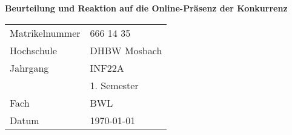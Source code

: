 \begin{titlepage}
\begin{center}
\vspace*{1cm}

\huge
\textbf{Beurteilung und Reaktion auf die Online-Präsenz der Konkurrenz}

\vspace{1.5cm}




\vfill

\normalsize
\begin{tabular}{ ll }
Matrikelnummer & 666 14 35\\
Hochschule & DHBW Mosbach\\
Jahrgang & INF22A\\
 & 1. Semester\\
Fach & BWL\\
Datum & \today{}
\end{tabular}


    
\end{center}
\end{titlepage}
